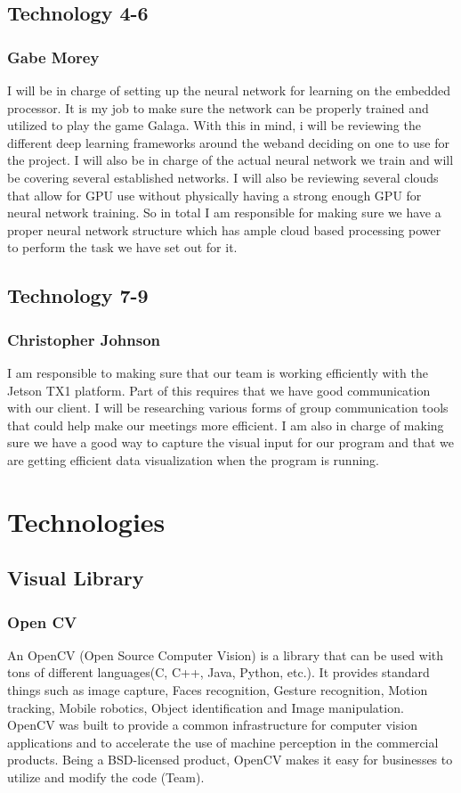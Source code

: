 \documentclass{scrreprt}
\begin{document}
\section{Technology 4-6}
\subsection{Gabe Morey}
I will be in charge of setting up the neural network for learning on the embedded processor. 
It is my job to make sure the network can be properly trained and utilized to play the game Galaga.
With this in mind, i will be reviewing the different deep learning frameworks around the weband deciding on one to use for the project. 
I will also be in charge of the actual neural network we train and will be covering several established networks. 
I will also be reviewing several clouds that allow for GPU use without physically having a strong enough GPU for neural network training. So in total I am responsible for making sure we have a proper neural network structure which has ample cloud based processing power to perform the task we have set out for it.

\section{Technology 7-9}
\subsection{Christopher Johnson}
I am responsible to making sure that our team is working efficiently with the Jetson TX1 platform.
Part of this requires that we have good communication with our client.
I will be researching various forms of group communication tools that could help make our meetings more efficient.
I am also in charge of making sure we have a good way to capture the visual input for our program and that we are getting efficient data visualization when the program is running.

\chapter{Technologies}
\section{Visual Library}
\subsection{Open CV}
An OpenCV (Open Source Computer Vision) is a library that can be used with tons of different languages(C, C++, Java, Python, etc.).
 It provides standard things such as image capture, Faces recognition, Gesture recognition, Motion tracking, Mobile robotics, Object identification and Image manipulation.
 OpenCV was built to provide a common infrastructure for computer vision applications and to accelerate the use of machine perception in the commercial products.
 Being a BSD-licensed product, OpenCV makes it easy for businesses to utilize and modify the code (Team).
\end{document}
